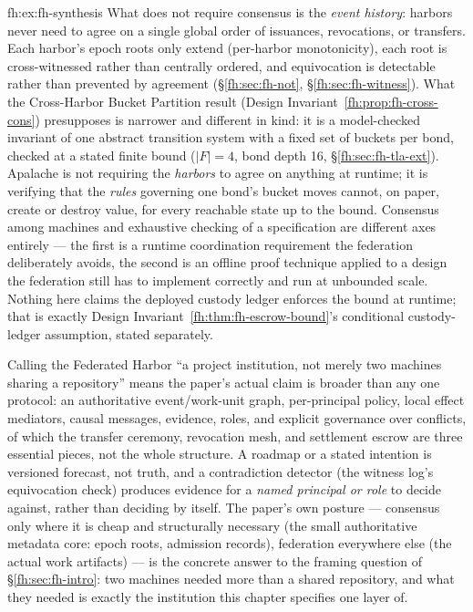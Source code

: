 \begin{pdSolution}{fh:ex:fh-synthesis}
What does not require consensus is the \emph{event history}: harbors never need to agree on a single global order of issuances, revocations, or transfers. Each harbor's epoch roots only extend (per-harbor monotonicity), each root is cross-witnessed rather than centrally ordered, and equivocation is detectable rather than prevented by agreement (\S\ref{fh:sec:fh-not}, \S\ref{fh:sec:fh-witness}). What the Cross-Harbor Bucket Partition result (Design Invariant~\ref{fh:prop:fh-cross-cons}) presupposes is narrower and different in kind: it is a model-checked invariant of one abstract transition system with a fixed set of buckets per bond, checked at a stated finite bound ($|F|=4$, bond depth 16, \S\ref{fh:sec:fh-tla-ext}). Apalache is not requiring the \emph{harbors} to agree on anything at runtime; it is verifying that the \emph{rules} governing one bond's bucket moves cannot, on paper, create or destroy value, for every reachable state up to the bound. Consensus among machines and exhaustive checking of a specification are different axes entirely --- the first is a runtime coordination requirement the federation deliberately avoids, the second is an offline proof technique applied to a design the federation still has to implement correctly and run at unbounded scale. Nothing here claims the deployed custody ledger enforces the bound at runtime; that is exactly Design Invariant~\ref{fh:thm:fh-escrow-bound}'s conditional custody-ledger assumption, stated separately.

Calling the Federated Harbor ``a project institution, not merely two machines sharing a repository'' means the paper's actual claim is broader than any one protocol: an authoritative event/work-unit graph, per-principal policy, local effect mediators, causal messages, evidence, roles, and explicit governance over conflicts, of which the transfer ceremony, revocation mesh, and settlement escrow are three essential pieces, not the whole structure. A roadmap or a stated intention is versioned forecast, not truth, and a contradiction detector (the witness log's equivocation check) produces evidence for a \emph{named principal or role} to decide against, rather than deciding by itself. The paper's own posture --- consensus only where it is cheap and structurally necessary (the small authoritative metadata core: epoch roots, admission records), federation everywhere else (the actual work artifacts) --- is the concrete answer to the framing question of \S\ref{fh:sec:fh-intro}: two machines needed more than a shared repository, and what they needed is exactly the institution this chapter specifies one layer of.
\end{pdSolution}
